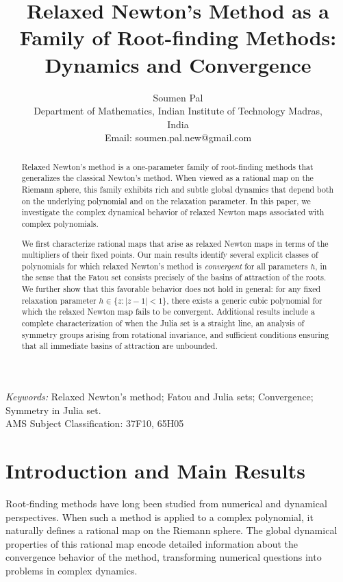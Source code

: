 \documentclass[12pt]{article}
\date{}
\numberwithin{equation}{section}
\begin{document}
	\title{Relaxed Newton’s Method as a Family of Root-finding Methods: Dynamics and Convergence}
	\author{Soumen Pal\\Department of Mathematics, Indian Institute of Technology Madras,\\ India\\ Email: soumen.pal.new@gmail.com}
	\date{}
	\maketitle
\begin{abstract}
Relaxed Newton's method is a one-parameter family of root-finding methods that generalizes the classical Newton's method. When viewed as a rational map on the Riemann sphere, this family exhibits rich and subtle global dynamics that depend both on the underlying polynomial and on the relaxation parameter. In this paper, we investigate the complex dynamical behavior of relaxed Newton maps associated with complex polynomials.

We first characterize rational maps that arise as relaxed Newton maps in terms of the multipliers of their fixed points. Our main results identify several explicit classes of polynomials for which relaxed Newton's method is \textit{convergent} for all parameters $h$, in the sense that the Fatou set consists precisely of the basins of attraction of the roots. We further show that this favorable behavior does not hold in general: for any fixed relaxation parameter $h\in \{z:|z-1|<1\}$, there exists a generic cubic polynomial for which the relaxed Newton map fails to be convergent. Additional results include a complete characterization of when the Julia set is a straight line, an analysis of symmetry groups arising from rotational invariance, and sufficient conditions ensuring that all immediate basins of attraction are unbounded.
\end{abstract}
\textit{Keywords:} Relaxed Newton's method; Fatou and Julia sets; Convergence; Symmetry in Julia set.\\
	AMS Subject Classification: 37F10, 65H05
\section{Introduction and Main Results}
Root-finding methods have long been studied from numerical and dynamical
perspectives. When such a method is applied to a complex polynomial, it naturally defines a rational map on the Riemann sphere. The global dynamical properties of this rational map encode detailed information about the convergence behavior of the method, transforming numerical questions into problems in complex dynamics.
\end{document}
